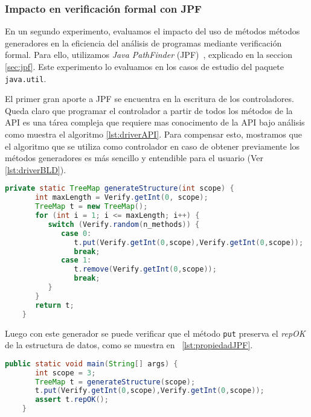 

\subsubsection{Impacto en verificación formal con JPF}

En un segundo experimento, evaluamos el impacto del uso de métodos métodos generadores en la eficiencia 
del análisis de programas mediante verificación formal. Para ello, utilizamos \emph{Java PathFinder} 
(JPF)~\cite{Visser:2005}, explicado en la seccion \ref{sec:jpf}.
Este experimento lo evaluamos en los casos de estudio del paquete \texttt{java.util}.

El primer gran aporte a JPF se encuentra en la escritura de los controladores. Queda claro que programar el controlador
a partir de todos los métodos de la API es una tárea compleja que requiere
mas conocimento de la API bajo análisis como muestra el algoritmo \ref{lst:driverAPI}. Para
compensar esto, mostramos que el algoritmo que se utiliza como controlador en caso
de obtener previamente los métodos generadores es más sencillo y entendible para el usuario (Ver \ref{lst:driverBLD}).
\\
\begin{lstlisting}[language=Java,caption={Controlador con los métodos generadores de objectos},label={lst:driverBLD},captionpos=b]
    private static TreeMap generateStructure(int scope) {
       int maxLength = Verify.getInt(0, scope);
       TreeMap t = new TreeMap();
       for (int i = 1; i <= maxLength; i++) {
          switch (Verify.random(n_methods)) {
             case 0:
                t.put(Verify.getInt(0,scope),Verify.getInt(0,scope));
                break;
             case 1:
                t.remove(Verify.getInt(0,scope));
                break;						
          }
       }
       return t;
    }
\end{lstlisting}

Luego con este generador se puede verificar que el método \texttt{put} preserva el \emph{repOK} de la estructura de datos, como se muestra en ~\ref{lst:propiedadJPF}.

\begin{lstlisting}[caption={Probando el método put de TreeMap con JPF},label={lst:propiedadJPF},language=Java,captionpos=b]
    public static void main(String[] args) {
       int scope = 3;
       TreeMap t = generateStructure(scope);
       t.put(Verify.getInt(0,scope),Verify.getInt(0,scope));
       assert t.repOK();
    }
\end{lstlisting}

